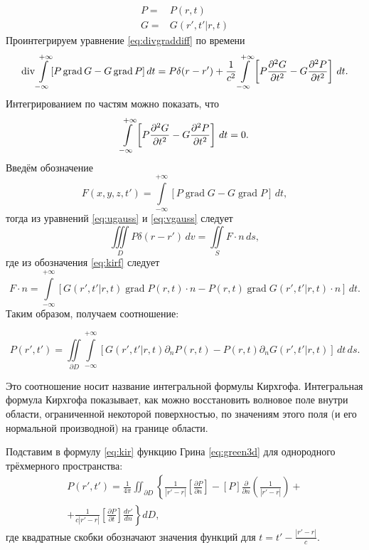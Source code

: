 \documentclass[a4paper, fontsize=14pt]{article}
\newcommand{\divop}{\operatorname{div}}
\newcommand{\gradop}{\operatorname{grad}}
\begin{document}
	\begin{align}
		P =& P(r,t) \\
		G =& G(r',t'|r,t)
	\end{align}
	Проинтегрируем уравнение \eqref{eq:divgraddiff} по времени
	\begin{equation}
		\divop \int\limits_{-\infty}^{+\infty} [P \gradop G - G \gradop P ]\, dt=  P\delta(r-r') +\frac{1}{c^2}\int\limits_{-\infty}^{+\infty}\left[P\diff[2]{G}{t} - G \diff[2]{P}{t}\right]\,dt.
		\label{eq:ugauss}
	\end{equation}
	Интегрированием по частям можно показать, что 
	$$
	\int\limits_{-\infty}^{+\infty}\left[P\diff[2]{G}{t} - G \diff[2]{P}{t}\right]\,dt = 0.
	$$
	Введём обозначение 
	\begin{equation}
			F(x,y,z,t') = \int\limits_{-\infty}^{+\infty} [P \gradop G - G \gradop P ]\, dt,
		\label{eq:kirf}
	\end{equation}
	тогда из уравнений \eqref{eq:ugauss} и \eqref{eq:vgauss} следует
	\begin{equation}
		\iiint\limits_D P\delta(r-r') \, dv = \iint\limits_S F \cdot n \, ds,
	\end{equation}
	где из обозначения \eqref{eq:kirf} следует
	\begin{equation}
		F\cdot n =  \int\limits_{-\infty}^{+\infty} 
		[G(r',t'|r,t)\gradop P(r,t) \cdot n
		- P(r,t)\gradop G(r',t'|r,t) \cdot n] \,dt.
	\end{equation}
Таким образом, получаем соотношение:
	
	\begin{equation}
		P(r',t') = \iint\limits_{\partial D} \int\limits_{-\infty}^{+\infty} 
	[G(r',t'|r,t)\partial_n P(r,t) 
	- P(r,t)\partial_n G(r',t'|r,t)] \,dt\,ds.
	\label{eq:kir}
	\end{equation}
	
	
	Это соотношение носит название интегральной формулы Кирхгофа.
	Интегральная
	формула Кирхгофа показывает, как можно восстановить волновое поле внутри области,
	ограниченной некоторой поверхностью, по значениям этого поля (и его нормальной
	производной) на границе области.
	
	Подставим в формулу \eqref{eq:kir} функцию Грина \eqref{eq:green3d} для однородного трёхмерного пространства:
	\begin{multline}
		P\left(r',t'\right)=\frac{1}{4\pi}\iint_{\partial D}^{}\left\{\frac{1}{|r'-r|}\left[\frac{\partial P}{\partial n}\right]-\left[P\right]\frac{\partial}{\partial n}\left(\frac{1}{|r'-r|}\right)+ \right. \\ 
		+\left. \frac{1}{c |r'-r|}\left[\frac{\partial P}{\partial t}\right]\frac{d r'}{d n}\right\}d D,
		\label{eq:kirg0}
	\end{multline}
		где квадратные скобки обозначают значения функций для $t=t'-\frac{|r'-r|}{c}$.
	
\end{document}
